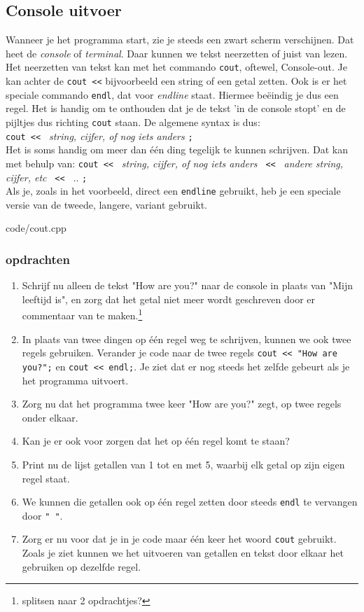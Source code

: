 \documentclass[12pt,a4paper]{article}
\newcommand{\code}{}
\newcommand{\icode}{\lstinline}
\begin{document}
\subsection{Console uitvoer}
Wanneer je het programma start, zie je steeds een zwart scherm verschijnen. Dat heet de \emph{console} of \emph{terminal}. Daar kunnen we tekst neerzetten of juist van lezen. Het neerzetten van tekst kan met het commando \icode{cout}, oftewel, Console-out. Je kan achter de \icode{cout <<} bijvoorbeeld een string of een getal zetten. Ook is er het speciale commando \icode{endl}, dat voor \emph{endline} staat. Hiermee be\"eindig je dus een regel. Het is handig om te onthouden dat je de tekst 'in de console stopt' en de pijltjes dus richting \icode{cout} staan. De algemene syntax is dus:\\
\icode{cout << } \emph{string, cijfer, of nog iets anders} \icode{;}\\
Het is soms handig om meer dan \'e\'en ding tegelijk te kunnen schrijven. Dat kan met behulp van:
\icode{cout << } \emph{string, cijfer, of nog iets anders} \icode{ << } \emph{andere string, cijfer, etc} \icode{ << } .. \icode{;}\\
Als je, zoals in het voorbeeld, direct een \icode{endline} gebruikt, heb je een speciale versie van de tweede, langere, variant gebruikt.

\code{code/cout.cpp}

\subsubsection{opdrachten}
\begin{enumerate}
		\item
			Schrijf nu alleen de tekst "How are you?" naar de console in plaats van "Mijn leeftijd is", en zorg dat het getal niet meer wordt geschreven door er commentaar van te maken.\footnote{splitsen naar 2 opdrachtjes?}
		\item
			In plaats van twee dingen op \'e\'en regel weg te schrijven, kunnen we ook twee regels gebruiken. Verander je code naar de twee regels \icode{cout << "How are you?";} en \icode{cout << endl;}. Je ziet dat er nog steeds het zelfde gebeurt als je het programma uitvoert.
		\item
			Zorg nu dat het programma twee keer "How are you?" zegt, op twee regels onder elkaar.
		\item
			Kan je er ook voor zorgen dat het op \'e\'en regel komt te staan?
		\item
			Print nu de lijst getallen van 1 tot en met 5, waarbij elk getal op zijn eigen regel staat.
		\item
			We kunnen die getallen ook op \'e\'en regel zetten door steeds \icode{endl} te vervangen door \icode{" "}.
		\item
			Zorg er nu voor dat je in je code maar \'e\'en keer het woord \icode{cout} gebruikt.
			Zoals je ziet kunnen we het uitvoeren van getallen en tekst door elkaar het gebruiken op dezelfde regel.
\end{enumerate}
\end{document}
